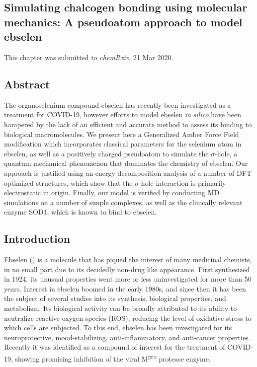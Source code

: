 \begin{refsection}

\chapter[Simulating chalcogen bonding using molecular mechanics]{Simulating chalcogen bonding using molecular mechanics: A pseudoatom approach to model ebselen}\label{ch:ebs-param}

This chapter was submitted to \textit{chemRxiv}, 21 Mar 2020.\autocite{Fellowes2020chemrxiv}

\section{Abstract}
The organoselenium compound ebselen has recently been investigated as a treatment for COVID-19, however efforts to model ebselen \emph{in silico} have been hampered by the lack of an efficient and accurate method to assess its binding to biological macromolecules. We present here a Generalized Amber Force Field modification which incorporates classical parameters for the selenium atom in ebselen, as well as a positively charged pseudoatom to simulate the $ \sigma $-hole, a quantum mechanical phenomenon that dominates the chemistry of ebselen. Our approach is justified using an energy decomposition analysis of a number of DFT optimized structures, which show that the $ \sigma $-hole interaction is primarily electrostatic in origin. Finally, our model is verified by conducting MD simulations on a number of simple complexes, as well as the clinically relevant enzyme SOD1, which is known to bind to ebselen.

\section{Introduction}
Ebselen () is a molecule that has piqued the interest of many medicinal chemists, in no small part due to its decidedly non-drug like appearance.
First synthesized in 1924, its unusual properties went more or less uninvestigated for more than 50 years.\autocite{Lesser1924}
Interest in ebselen boomed in the early 1980s, and since then it has been the subject of several studies into its synthesis, biological properties, and metabolism.\autocite{Weber1976,Renson1981,Muller1984,Wendel1984,Parnham1984,Engman1989,Schewe1995,Bhabak2010,Iwasaki2017}
Its biological activity can be broadly attributed to its ability to neutralize reactive oxygen species (ROS), reducing the level of oxidative stress to which cells are subjected.\autocite{Mugesh2000}
To this end, ebselen has been investigated for its neuroprotective, mood-stabilizing, anti-inflammatory, and anti-cancer properties.\autocite{Parnham1987,Kil2007,Singh2013,Azad2014,Parnham2000,Chantadul2020}
Recently it was identified as a compound of interest for the treatment of COVID-19, showing promising inhibition of the viral M\textsuperscript{pro} protease enzyme.\autocite{Jin2020}


\end{refsection}
